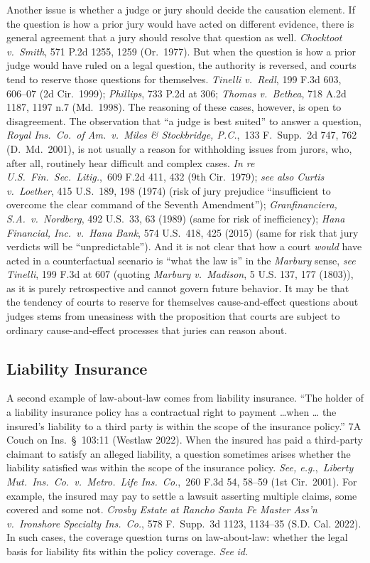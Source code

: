 \documentclass[
  12pt,
  letterpaper,
]{scrartcl}
\begin{document}
Another issue is whether a judge or jury should decide the causation element.
If the question is how a prior jury would have acted on different evidence,
there is general agreement that a jury should resolve that question as well.
\textit{Chocktoot v.~Smith}, 571 P.2d 1255, 1259 (Or.~1977). But when the
question is how a prior judge would have ruled on a legal question, the
authority is reversed, and courts tend to reserve those questions for
themselves. \textit{Tinelli v.~Redl}, 199 F.3d 603, 606--07 (2d Cir.~1999);
\textit{Phillips}, 733 P.2d at 306; \textit{Thomas v.~Bethea}, 718 A.2d 1187,
1197 n.7 (Md.~1998). The reasoning of these cases, however, is open to
disagreement. The observation that ``a judge is best suited'' to answer a
question, \textit{Royal Ins.~Co.~of Am.~v.~Miles \& Stockbridge, P.C.},~133
F.~Supp.~2d 747, 762 (D.~Md.~2001), is not usually a reason for withholding
issues from jurors, who, after all, routinely hear difficult and complex cases.
\textit{In re U.S.~Fin.~Sec.~Litig.},~609 F.2d 411, 432 (9th Cir.~1979);
\textit{see also} \textit{Curtis v.~Loether}, 415 U.S.~189, 198 (1974) (risk of
jury prejudice ``insufficient to overcome the clear command of the Seventh
Amendment''); \textit{Granfinanciera, S.A.~v.~Nordberg}, 492 U.S.~33, 63 (1989)
(same for risk of inefficiency); \textit{Hana Financial, Inc.~v.~Hana Bank},
574 U.S.~418, 425 (2015) (same for risk that jury verdicts will be
``unpredictable''). And it is not clear that how a court \emph{would} have
acted in a counterfactual scenario is ``what the law is'' in the
\textit{Marbury} sense, \textit{see} \textit{Tinelli}, 199 F.3d at 607 (quoting
\textit{Marbury v.~Madison}, 5 U.S. 137, 177 (1803)), as it is purely
retrospective and cannot govern future behavior. It may be that the tendency of
courts to reserve for themselves cause-and-effect questions about judges stems
from uneasiness with the proposition that courts are subject to ordinary
cause-and-effect processes that juries can reason about.


\subsection{Liability Insurance}

A second example of law-about-law comes from liability insurance. ``The holder
of a liability insurance policy has a contractual right to payment \ldots when \ldots
the insured's liability to a third party is within the scope of the insurance
policy.'' 7A Couch on Ins.~§~103:11 (Westlaw 2022). When the insured has paid a
third-party claimant to satisfy an alleged liability, a question sometimes
arises whether the liability satisfied was within the scope of the insurance
policy. \textit{See, e.g.},~\textit{Liberty Mut.~Ins.~Co.~v.~Metro.~Life
Ins.~Co.},~260 F.3d 54, 58--59 (1st Cir.~2001). For example, the insured may
pay to settle a lawsuit asserting multiple claims, some covered and some not.
\textit{Crosby Estate at Rancho Santa Fe Master Ass'n v.~Ironshore Specialty
Ins.~Co.}, 578 F.~Supp.~3d 1123, 1134--35 (S.D. Cal. 2022). In such cases, the
coverage question turns on law-about-law: whether the legal basis for liability
fits within the policy coverage. \textit{See} \textit{id.}
\end{document}
